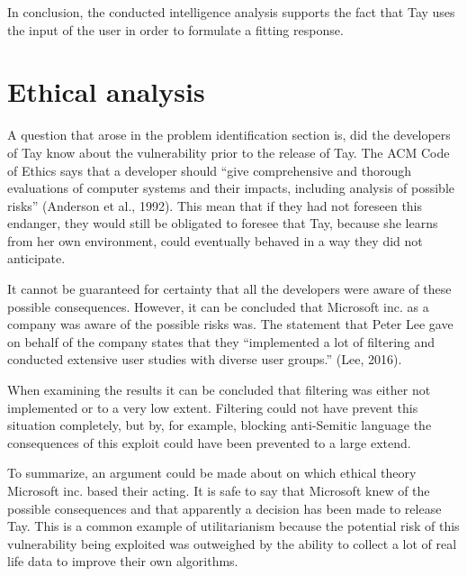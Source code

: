 In conclusion, the conducted intelligence analysis supports the fact that Tay uses the input of the user in order to formulate a fitting response.

\section{Ethical analysis}
A question that arose in the problem identification section is, did the developers of Tay know about the vulnerability prior to the release of Tay. The ACM Code of Ethics says that a developer should “give comprehensive and thorough evaluations of computer systems and their impacts, including analysis of possible risks” (Anderson et al., 1992). This mean that if they had not foreseen this endanger, they would still be obligated to foresee that Tay, because she learns from her own environment, could eventually behaved in a way they did not anticipate.

It cannot be guaranteed for certainty that all the developers were aware of these possible consequences. However, it can be concluded that Microsoft inc. as a company was aware of the possible risks was. The statement that Peter Lee gave on behalf of the company states that they “implemented a lot of filtering and conducted extensive user studies with diverse user groups.” (Lee, 2016).

When examining the results it can be concluded that filtering was either not implemented or to a very low extent. Filtering could not have prevent this situation completely, but by, for example, blocking anti-Semitic language the consequences of this exploit could have been prevented to a  large extend.

To summarize, an argument could be made about on which ethical theory Microsoft inc. based their acting. It is safe to say that Microsoft knew of the possible consequences and that apparently a decision has been made to release Tay. This is a common example of utilitarianism because the potential risk of this vulnerability being exploited was outweighed by the ability to collect a lot of real life data to improve their own algorithms.
